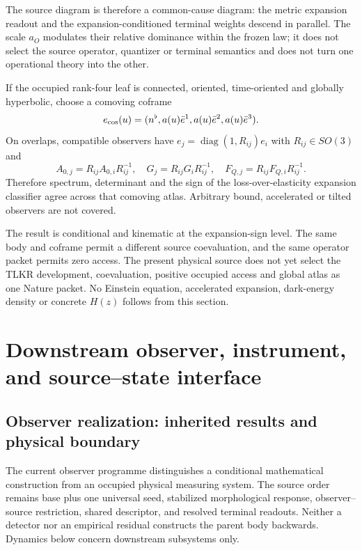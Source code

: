 \documentclass[11pt]{article}
\begin{document}
The source diagram is therefore a common-cause diagram: the metric expansion
readout and the expansion-conditioned terminal weights descend in parallel.
The scale $a_O$ modulates their relative dominance within the frozen law; it
does not select the source operator, quantizer or terminal semantics and does
not turn one operational theory into the other.

If the occupied rank-four leaf is connected, oriented, time-oriented and
globally hyperbolic, choose a comoving coframe
\begin{equation}
 e_{\rm cos}(u)=(n^\flat,a(u)\bar e^1,a(u)\bar e^2,a(u)\bar e^3).
 \label{eq:viia-ectr-cosmological-coframe}
\end{equation}
On overlaps, compatible observers have
$e_j=\operatorname{diag}(1,R_{ij})e_i$ with $R_{ij}\in SO(3)$ and
\begin{equation}
 A_{0,j}=R_{ij}A_{0,i}R_{ij}^{-1},\quad
 G_j=R_{ij}G_iR_{ij}^{-1},\quad
 F_{Q,j}=R_{ij}F_{Q,i}R_{ij}^{-1}.
 \label{eq:viia-ectr-atlas}
\end{equation}
Therefore spectrum, determinant and the sign of the loss-over-elasticity
expansion classifier agree across that comoving atlas.  Arbitrary bound,
accelerated or tilted observers are not covered.

The result is conditional and kinematic at the expansion-sign level.  The
same body and coframe permit a different source coevaluation, and the same
operator packet permits zero access.  The present physical source does not
yet select the TLKR development, coevaluation, positive occupied access and
global atlas as one Nature packet.  No Einstein equation, accelerated
expansion, dark-energy density or concrete $H(z)$ follows from this section.

\section{Downstream observer, instrument, and source--state interface}
\label{sec:downstream-viia-interface}

\subsection{Observer realization: inherited results and physical boundary}
\label{sec:observer-update-20260914}
The current observer programme distinguishes a conditional mathematical
construction from an occupied physical measuring system. The source order
remains base plus one universal seed, stabilized morphological response,
observer--source restriction, shared descriptor, and resolved terminal
readouts. Neither a detector nor an empirical residual constructs the parent
body backwards. Dynamics below concern downstream subsystems only.
\end{document}
